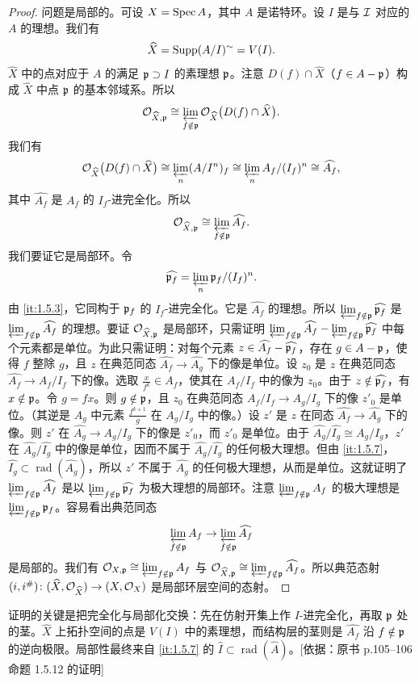 \begin{proof}
问题是局部的。可设 $X=\operatorname{Spec} A$，其中 $A$ 是诺特环。设 $I$ 是与 $\mathcal{I}$ 对应的 $A$ 的理想。我们有
\[
\widehat X=\operatorname{Supp}(A/I)^{\sim}=V(I).
\]
$\widehat X$ 中的点对应于 $A$ 的满足 $\mathfrak{p}\supset I$ 的素理想 $\mathfrak{p}$。注意 $D(f)\cap\widehat X$（$f\in A-\mathfrak{p}$）构成 $\widehat X$ 中点 $\mathfrak{p}$ 的基本邻域系。所以
\[
\mathcal{O}_{\widehat X,\mathfrak{p}}\cong\varprojlim_{f\notin\mathfrak{p}}\mathcal{O}_{\widehat X}\bigl(D(f)\cap\widehat X\bigr).
\]
我们有
\[
\mathcal{O}_{\widehat X}\bigl(D(f)\cap\widehat X\bigr)\cong\varprojlim_n(A/I^n)_f\cong\varprojlim_n A_f/(I_f)^n\cong\widehat{A_f},
\]
其中 $\widehat{A_f}$ 是 $A_f$ 的 $I_f$-进完全化。所以
\[
\mathcal{O}_{\widehat X,\mathfrak{p}}\cong\varprojlim_{f\notin\mathfrak{p}}\widehat{A_f}.
\]
我们要证它是局部环。令
\[
\widehat{\mathfrak{p}_f}=\varprojlim_n\mathfrak{p}_f/(I_f)^n.
\]
由 \ref{it:1.5.3}，它同构于 $\mathfrak{p}_f$ 的 $I_f$-进完全化。它是 $\widehat{A_f}$ 的理想。所以 $\varprojlim_{f\notin\mathfrak{p}}\widehat{\mathfrak{p}_f}$ 是 $\varprojlim_{f\notin\mathfrak{p}}\widehat{A_f}$ 的理想。要证 $\mathcal{O}_{\widehat X,\mathfrak{p}}$ 是局部环，只需证明 $\varprojlim_{f\notin\mathfrak{p}}\widehat{A_f}-\varprojlim_{f\notin\mathfrak{p}}\widehat{\mathfrak{p}_f}$ 中每个元素都是单位。为此只需证明：对每个元素 $z\in\widehat{A_f}-\widehat{\mathfrak{p}_f}$，存在 $g\in A-\mathfrak{p}$，使得 $f$ 整除 $g$，且 $z$ 在典范同态 $\widehat{A_f}\to\widehat{A_g}$ 下的像是单位。设 $z_0$ 是 $z$ 在典范同态 $\widehat{A_f}\to A_f/I_f$ 下的像。选取 $\frac{x}{f^k}\in A_f$，使其在 $A_f/I_f$ 中的像为 $z_0$。由于 $z\notin\widehat{\mathfrak{p}_f}$，有 $x\notin\mathfrak{p}$。令 $g=fx$。则 $g\notin\mathfrak{p}$，且 $z_0$ 在典范同态 $A_f/I_f\to A_g/I_g$ 下的像 $z'_0$ 是单位。（其逆是 $A_g$ 中元素 $\frac{f^{k+1}}{g}$ 在 $A_g/I_g$ 中的像。）设 $z'$ 是 $z$ 在同态 $\widehat{A_f}\to\widehat{A_g}$ 下的像。则 $z'$ 在 $\widehat{A_g}\to A_g/I_g$ 下的像是 $z'_0$，而 $z'_0$ 是单位。由于 $\widehat{A_g}/\widehat{I_g}\cong A_g/I_g$，$z'$ 在 $\widehat{A_g}/\widehat{I_g}$ 中的像是单位，因而不属于 $\widehat{A_g}/\widehat{I_g}$ 的任何极大理想。但由 \ref{it:1.5.7}，$\widehat{I_g}\subset\operatorname{rad}(\widehat{A_g})$，所以 $z'$ 不属于 $\widehat{A_g}$ 的任何极大理想，从而是单位。这就证明了 $\varprojlim_{f\notin\mathfrak{p}}\widehat{A_f}$ 是以 $\varprojlim_{f\notin\mathfrak{p}}\widehat{\mathfrak{p}_f}$ 为极大理想的局部环。注意 $\varprojlim_{f\notin\mathfrak{p}}A_f$ 的极大理想是 $\varprojlim_{f\notin\mathfrak{p}}\mathfrak{p}_f$。容易看出典范同态
\[
\varprojlim_{f\notin\mathfrak{p}}A_f\to\varprojlim_{f\notin\mathfrak{p}}\widehat{A_f}
\]
是局部的。我们有 $\mathcal{O}_{X,\mathfrak{p}}\cong\varprojlim_{f\notin\mathfrak{p}}A_f$ 与 $\mathcal{O}_{\widehat X,\mathfrak{p}}\cong\varprojlim_{f\notin\mathfrak{p}}\widehat{A_f}$。所以典范态射 $(i,i^\#)\colon(\widehat X,\mathcal{O}_{\widehat X})\to(X,\mathcal{O}_X)$ 是局部环层空间的态射。
\end{proof}
\begin{tnote}
证明的关键是把完全化与局部化交换：先在仿射开集上作 $I$-进完全化，再取 $\mathfrak{p}$ 处的茎。$\widehat X$ 上拓扑空间的点是 $V(I)$ 中的素理想，而结构层的茎则是 $\widehat{A_f}$ 沿 $f\notin\mathfrak{p}$ 的逆向极限。局部性最终来自 \ref{it:1.5.7} 的 $\widehat I\subset\operatorname{rad}(\widehat A)$。[依据：原书 p.105–106 命题 1.5.12 的证明]
\end{tnote}

